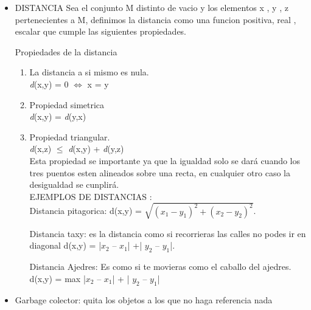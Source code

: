 \documentclass[a4paper,16pt]{article}
\begin{document}
\begin{itemize}
    \item DISTANCIA
Sea el conjunto M distinto de vacio y  los elementos  x , y , z  pertenecientes a M, definimos la distancia como una funcion positiva, real , escalar que cumple las siguientes propiedades.

Propiedades de la distancia
\begin{enumerate}
\item La distancia a si mismo es nula.
\\ \textit d({x,y}) = 0 $\Longleftrightarrow$  x = y

\item Propiedad simetrica
\\ \textit d({x,y}) = \textit d({y,x})


\item Propiedad triangular.
\\ \textit d({x,z}) $\leq$ \textit d({x,y}) + \textit d({y,z}) \\Esta propiedad se importante ya que la igualdad solo se dar\'a cuando los tres puentos esten alineados sobre una recta, en cualquier otro caso la desigualdad se cunplir\'a.
\\EJEMPLOS DE DISTANCIAS :\\
Distancia pitagorica: d(x,y) = $\sqrt{(x_{1} - y_{1})^{2} + (x_{2} - y_{2})^{2}}$.

 Distancia taxy: es la distancia como si recorrieras las calles no podes ir en diagonal
 d(x,y) =  |$x_{2}$ – $x_{1}$| +| $y_{2}$ – $y_{1}$|.


Distancia Ajedres: Es como si te movieras como el caballo del ajedres.
d(x,y) =  max {  |$x_{2}$ – $x_{1}$| + | $y_{2}$ – $y_{1}$|}


\end{enumerate}



    \item Garbage colector: quita los objetos a los que no haga referencia nada
\end{itemize}
\end{document}
